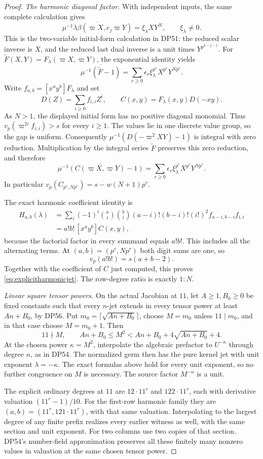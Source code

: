 \begin{proof}
\emph{The harmonic diagonal factor.}
With independent inputs, the same complete calculation gives
\[
 \overline{\mu^{-1}\lambda\beta(\varpi X,e_j\varpi Y)}
 =\xi_\lambda XY^N,\qquad \xi_\lambda\ne0.
\]
This is the two-variable initial-form calculation in DP51: the reduced scalar inverse is $X$, and the reduced last dual inverse is a unit times $Y^{p^{h-j-1}}$.
For $\widetilde F(X,Y)=F_\lambda(\varpi X,\varpi Y)$, the exponential identity yields
\[
 \overline{\mu^{-1}(\widetilde F-1)}
 =\sum_{r\ge0}\epsilon_r\xi_\lambda^{p^r}
       X^{p^r}Y^{Np^r}.
\]
Write $f_{a,b}=[x^ay^b]F_\lambda$ and set
\[
 D(Z)=\sum_{i\ge0}f_{i,i}Z^i,
 \qquad C(x,y)=F_\lambda(x,y)D(-xy).
\]
As $N>1$, the displayed initial form has no positive diagonal monomial.
Thus $v_p(\varpi^{2i}f_{i,i})>s$ for every $i\ge1$.
The values lie in one discrete value group, so the gap is uniform.
Consequently $\mu^{-1}(D(-\varpi^2XY)-1)$ is integral with zero reduction.
Multiplication by the integral series $\widetilde F$ preserves this zero reduction, and therefore
\[
 \overline{\mu^{-1}(C(\varpi X,\varpi Y)-1)}
 =\sum_{r\ge0}\epsilon_r\xi_\lambda^{p^r}
       X^{p^r}Y^{Np^r}.
\]
In particular $v_p(C_{p^r,Np^r})=s-w(N+1)p^r$.

The exact harmonic coefficient identity is
\begin{align*}
 H_{a,b}(\lambda)
 &=\sum_i(-1)^i\binom ai\binom bi
 (a-i)!(b-i)!(i!)^2 f_{a-i,b-i}f_{i,i}\\
 &=a!b!\,[x^ay^b]C(x,y),
\end{align*}
because the factorial factor in every summand equals $a!b!$.
This includes all the alternating terms.
At $(a,b)=(p^r,Np^r)$ both digit sums are one, so
\[
 v_p(a!b!)=s(a+b-2).
\]
Together with the coefficient of $C$ just computed, this proves \eqref{eq:explicitharmonicjet}.
The row-degree ratio is exactly $1:N$.

\emph{Linear square tensor powers.}
On the actual Jacobian at $11$, let $A\ge1,B_0\ge0$ be fixed constants such that every $n$-jet extends in every tensor power at least $An+B_0$, by DP56.
Put $m_0=\lceil\sqrt{An+B_0}\rceil$, choose $M=m_0$ unless $11\mid m_0$, and in that case choose $M=m_0+1$.
Then
\[
 11\nmid M,
 \qquad An+B_0\le M^2
 <An+B_0+4\sqrt{An+B_0}+4.
\]
At the chosen power $\kappa=M^2$, interpolate the algebraic prefactor to $U^{-\kappa}$ through degree $n$, as in DP54.
The normalized germ then has the pure kernel jet with unit exponent $\lambda=-\kappa$.
The exact formulas above hold for every unit exponent, so no further congruence on $M$ is necessary.
The source factor $M^{-n}$ is a unit.

The explicit ordinary degrees at $11$ are $12\cdot11^r$ and $122\cdot11^r$, each with derivative valuation $(11^r-1)/10$.
For the first-row harmonic family they are $(a,b)=(11^r,121\cdot11^r)$, with that same valuation.
Interpolating to the largest degree of any finite prefix realizes every earlier witness as well, with the same section and unit exponent.
For two columns use two copies of that section.
DP54's number-field approximation preserves all these finitely many nonzero values in valuation at the same chosen tensor power.
\end{proof}

